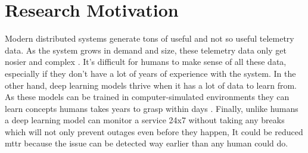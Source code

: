 
{\let\clearpage\relax\chapter{Research Motivation}}

Modern distributed systems generate tons of useful and not so useful telemetry data. As the system grows in demand and size, these telemetry data only get nosier and complex \citep{Untangli35:online}. It's difficult for humans to make sense of all these data, especially if they don't have a lot of years of experience with the system. In the other hand, deep learning models thrive when it has a lot of data to learn from. As these models can be trained in computer-simulated environments they can learn concepts humans takes years to grasp within days \citep{OpenAI_dota, silver2017mastering}. Finally, unlike humans a deep learning model can monitor a service 24x7 without taking any breaks which will not only prevent outages even before they happen, It could be reduced \ac{mttr} because the issue can be detected way earlier than any human could do. 

